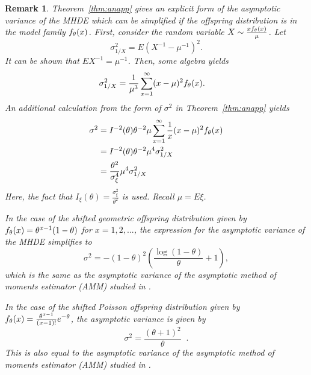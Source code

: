 \documentclass[11 pt]{article}
\newtheorem{rem}{Remark}
\renewcommand{\th}{\theta}
\newcommand{\fb}[1]{ \mathop{ \left[ #1 \right] } }
\begin{document}
\begin{rem}
\label{rem:asympvar}
Theorem~\ref{thm:anapp} gives an explicit form of the asymptotic variance of the MHDE which can be simplified if the offspring distribution is in the model family $\fth$. First, consider the random variable $X \sim \frac{x \fth}{\mu}$. Let 
\[
\sigma_{1/X}^2 = E(X^{-1} - \mu^{-1})^2.
\]
It can be shown that $EX^{-1} = \mu^{-1}$. Then, some algebra yields
\begin{align*}
\sigma_{1/X}^2 &= \frac{1}{\mu^3} \sum_{x=1}^{\infty} (x - \mu)^2 \fth.
\end{align*}
An additional calculation from the form of $\sigma^2$ in Theorem~\ref{thm:anapp} yields
\begin{align*}
\sigma^2 &= I^{-2}(\th)  \th^{-2} \mu\sum_{x =1}^{\infty} \frac{1}{x} (x - \mu)^2 \fth \\
&= I^{-2}(\th) \th^{-2} \mu^4 \sigma^2_{1/X} \\
&=  \frac{\th^2}{\sigma_{\xi}^4} \mu^4 \sigma^2_{1/X} \\
\end{align*}
Here, the fact that $I_{\xi}(\th) = \frac{\sigma_{\xi}^2}{\th^2}$ is used. Recall $\mu = E\xi$.

In the case of the shifted geometric offspring distribution given by $\fth = \th^{x-1}(1-\th)$ for $x = 1,2,...$, the expression for the asymptotic variance of the MHDE simplifies to
\[
\sigma^2 = -(1-\th)^2 \left ( \frac{\log (1 - \th)}{\th} + 1 \right ),
\]
which is the same as the asymptotic variance of the asymptotic method of moments estimator (AMM) studied in \cite{mm}.

In the case of the shifted Poisson offspring distribution given by $\fth = \frac{\th^{x-1}}{(x-1)!}e^{-\th}$, the asymptotic variance is given by
\[
\sigma^2 = \frac{(\th + 1)^2}{\th} \fb{1 - (\th + 1)e^{-\th}}.
\]
This is also equal to the asymptotic variance of the asymptotic method of moments estimator (AMM) studied in \cite{mm}.
\end{rem}
\end{document}
